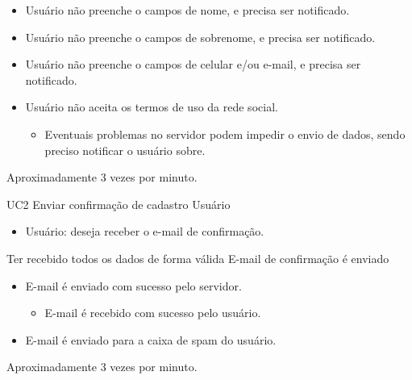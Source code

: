 {
\begin{itemize}
	\item Usuário não preenche o campos de nome, e precisa ser notificado.

	\item Usuário não preenche o campos de sobrenome, e precisa ser notificado.

	\item Usuário não preenche o campos de celular e/ou e-mail, e precisa ser notificado.

	\item Usuário não aceita os termos de uso da rede social.

	\begin{itemize}
		\item Eventuais problemas no servidor podem impedir o envio de dados, sendo preciso notificar o usuário sobre.
	\end{itemize}
\end{itemize}
}
{Aproximadamente 3 vezes por minuto.}
{

}


\casoDeUso
{UC2}
{Enviar confirmação de cadastro}
{Usuário}
{
\begin{itemize}
	\item Usuário: deseja receber o e-mail de confirmação.
\end{itemize}

}
{Ter recebido todos os dados de forma válida}
{E-mail de confirmação é enviado}
{
\begin{itemize}
	\item E-mail é enviado com sucesso pelo servidor.
	\begin{itemize}
		\item E-mail é recebido com sucesso pelo usuário.
	\end{itemize}

\end{itemize}
}
{
\begin{itemize}
\item E-mail é enviado para a caixa de spam do usuário.
\end{itemize}
}
{Aproximadamente 3 vezes por  minuto.}
{
 
}

